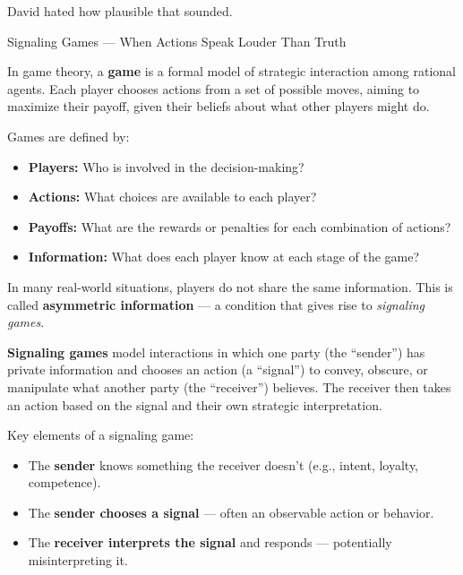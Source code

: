 David hated how plausible that sounded.

\medskip

\begin{TechnicalSidebar}{Signaling Games --- When Actions Speak Louder Than Truth}

    In game theory, a \textbf{game} is a formal model of strategic interaction among rational agents. 
    Each player chooses actions from a set of possible moves, aiming to maximize their payoff, 
    given their beliefs about what other players might do.

    \medskip
    
    Games are defined by:

    \medskip

    \begin{itemize}
      \item \textbf{Players:} Who is involved in the decision-making?
      \item \textbf{Actions:} What choices are available to each player?
      \item \textbf{Payoffs:} What are the rewards or penalties for each combination of actions?
      \item \textbf{Information:} What does each player know at each stage of the game?
    \end{itemize}

    \medskip
    
    In many real-world situations, players do not share the same information. 
    This is called \textbf{asymmetric information} — a condition that gives rise to 
    \emph{signaling games}.
    
    \medskip
    
    \textbf{Signaling games} model interactions in which one party (the ``sender'') has private 
    information and chooses an action (a ``signal'') to convey, obscure, or manipulate what 
    another party (the ``receiver'') believes. The receiver then takes an action based on the 
    signal and their own strategic interpretation.
    
    \medskip
    
    Key elements of a signaling game:

    \medskip

    \begin{itemize}
      \item The \textbf{sender} knows something the receiver doesn't (e.g., intent, loyalty, competence).
      \item The \textbf{sender chooses a signal} — often an observable action or behavior.
      \item The \textbf{receiver interprets the signal} and responds — potentially misinterpreting it.
    \end{itemize}


\end{TechnicalSidebar}

